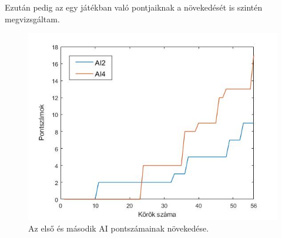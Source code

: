 Ezután pedig az egy játékban való pontjaiknak a növekedését is szintén megvizsgáltam.

\begin{figure}[h]
\centering
\includegraphics[scale=0.6]{images/player_points_AI2vsAI4.jpg}
\caption{Az első és második AI pontszámainak növekedése.}
\label{fig:player_scores2v4}
\end{figure}


